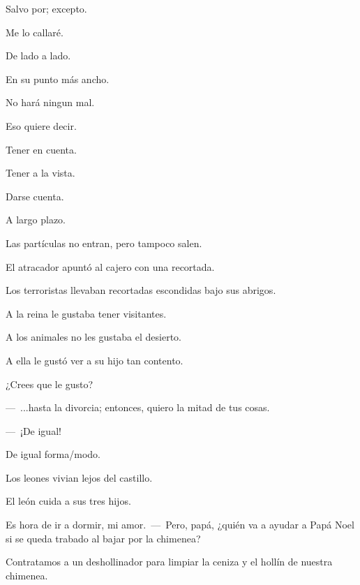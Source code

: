 \sk
Salvo por; excepto. 

\sk
Me lo callaré. 

\sk
De lado a lado.

\sk
En su punto más ancho. 

\sk
No hará ningun mal. 


\sk
Eso quiere decir. 

\sk
Tener en cuenta. 

\sk
Tener a la vista. 

\sk
Darse cuenta. 

\sk
A largo plazo. 

\sk
Las partículas no entran, pero tampoco salen. 

\sk
El atracador apuntó al cajero con una recortada. 

\sk
Los terroristas llevaban recortadas escondidas bajo sus abrigos. 

\sk
A la reina le gustaba tener visitantes.

\sk
A los animales no les gustaba el desierto. 

\sk
A ella le gustó ver a su hijo tan contento. 

\sk
¿Crees que le gusto? 

\sk
---~...hasta la divorcia; entonces, quiero la mitad de tus cosas.

---~¡De igual! 

\sk
De igual forma/modo. 

\sk
Los leones vivian lejos del castillo.

\sk
El león cuida a sus tres hijos.

\sk
Es hora de ir a dormir, mi amor.~---~Pero, papá, ¿quién va a ayudar a Papá Noel si se queda trabado al bajar por la chimenea? 

\sk
Contratamos a un deshollinador para limpiar la ceniza y el hollín de nuestra chimenea. 

